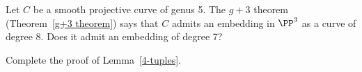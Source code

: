 \begin{exercise}\label{ex7.7}
Let $C$ be a smooth projective curve of genus 5. The
$g+3$ theorem
%
(Theorem~\ref{g+3 theorem}) says that $C$ admits an embedding in
$\PP^3$ as a
curve of degree 8.
%
Does it admit an embedding of degree 7?
\end{exercise}

\begin{exercise}\label{nonred 4-tuples}\label{ex7.8}
Complete the proof of Lemma~\ref{4-tuples}.
\end{exercise}

